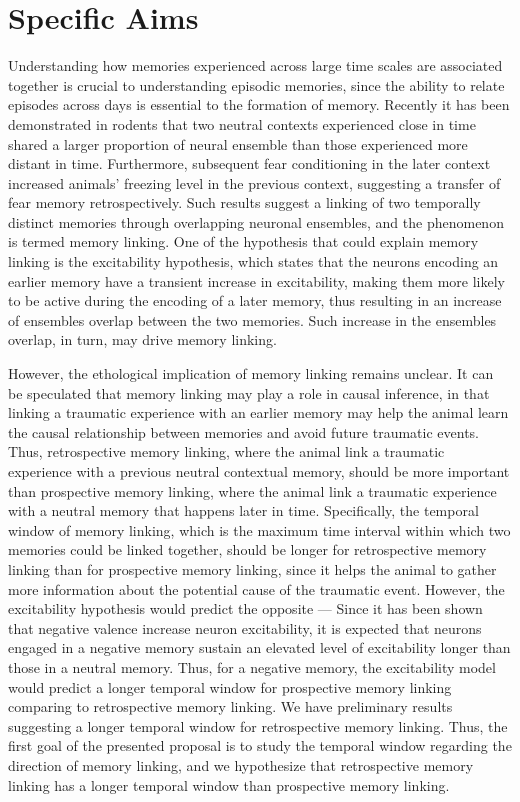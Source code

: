\documentclass[master.tex]{subfiles}
\begin{document}
\section*{Specific Aims}

Understanding how memories experienced across large time scales are associated
together is crucial to understanding episodic memories, since the ability to
relate episodes across days is essential to the formation of memory. Recently it
has been demonstrated in rodents that two neutral contexts experienced close in
time shared a larger proportion of neural ensemble than those experienced more
distant in time. Furthermore, subsequent fear conditioning in the later context
increased animals' freezing level in the previous context, suggesting a transfer
of fear memory retrospectively. Such results suggest a linking of two temporally
distinct memories through overlapping neuronal ensembles, and the phenomenon is
termed memory linking. One of the hypothesis that could explain memory linking
is the excitability hypothesis, which states that the neurons encoding an
earlier memory have a transient increase in excitability, making them more
likely to be active during the encoding of a later memory, thus resulting in an
increase of ensembles overlap between the two memories. Such increase in the
ensembles overlap, in turn, may drive memory linking.

However, the ethological implication of memory linking remains unclear. It can
be speculated that memory linking may play a role in causal inference, in that
linking a traumatic experience with an earlier memory may help the animal learn
the causal relationship between memories and avoid future traumatic events.
Thus, retrospective memory linking, where the animal link a traumatic experience
with a previous neutral contextual memory, should be more important than
prospective memory linking, where the animal link a traumatic experience with a
neutral memory that happens later in time. Specifically, the temporal window of
memory linking, which is the maximum time interval within which two memories
could be linked together, should be longer for retrospective memory linking than
for prospective memory linking, since it helps the animal to gather more
information about the potential cause of the traumatic event. However, the
excitability hypothesis would predict the opposite --- Since it has been shown
that negative valence increase neuron excitability, it is expected that neurons
engaged in a negative memory sustain an elevated level of excitability longer
than those in a neutral memory. Thus, for a negative memory, the excitability
model would predict a longer temporal window for prospective memory linking
comparing to retrospective memory linking. We have preliminary results
suggesting a longer temporal window for retrospective memory linking. Thus, the
first goal of the presented proposal is to study the temporal window regarding
the direction of memory linking, and we hypothesize that retrospective memory
linking has a longer temporal window than prospective memory linking.
\end{document}
